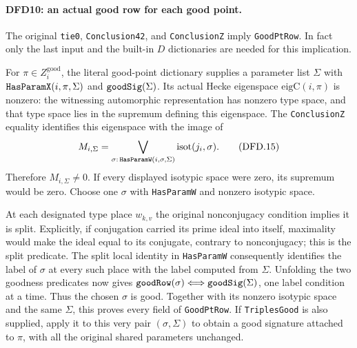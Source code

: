 \documentclass[11pt,a4paper]{article}
\numberwithin{equation}{section}
\theoremstyle{remark}\newtheorem{remark}[theorem]{Remark}
\begin{document}
\paragraph{DFD10: an actual good row for each good point.}
\label{claim:DFD10}
The original \texttt{tie0}, \texttt{Conclusion42}, and
\texttt{Conclusion\allowbreak Z} imply \texttt{Good\allowbreak Pt\allowbreak Row}. In fact
only the last input and the built-in $D$ dictionaries are
needed for this implication.

For $\pi\in Z_i^{\mathrm{good}}$, the literal good-point
dictionary supplies a parameter list $\Sigma$ with
$\texttt{Has\allowbreak Param\allowbreak X}(i,\pi,\Sigma)$ and
$\texttt{good\allowbreak Sig}(\Sigma)$. Its actual Hecke eigenspace
$\mathrm{eigC}(i,\pi)$ is nonzero: the witnessing
automorphic representation has nonzero type space, and that
type space lies in the supremum defining this eigenspace.
The \texttt{Conclusion\allowbreak Z} equality identifies this eigenspace
with the image of
\[
 M_{i,\Sigma}
    =\bigvee_{\sigma:\,\texttt{Has\allowbreak Param\allowbreak W}(i,\sigma,\Sigma)}
                      \mathrm{isot}(j_i,\sigma).         \tag{DFD.15}
\]
Therefore $M_{i,\Sigma}\ne0$. If every displayed isotypic
space were zero, its supremum would be zero. Choose one
$\sigma$ with \texttt{Has\allowbreak Param\allowbreak W} and nonzero isotypic space.

At each designated type place $w_{k,v}$ the original
nonconjugacy condition implies it is split. Explicitly, if
conjugation carried its prime ideal into itself, maximality
would make the ideal equal to its conjugate, contrary to
nonconjugacy; this is the split predicate. The split local
identity in \texttt{Has\allowbreak Param\allowbreak W} consequently identifies the
label of $\sigma$ at every such place with the label computed
from $\Sigma$. Unfolding the two goodness predicates now
gives
$\texttt{good\allowbreak Row}(\sigma)\Longleftrightarrow
\texttt{good\allowbreak Sig}(\Sigma)$, one label condition at a time.
Thus the chosen $\sigma$ is good. Together with its nonzero
isotypic space and the same $\Sigma$, this proves every field
of \texttt{Good\allowbreak Pt\allowbreak Row}. If \texttt{Triples\allowbreak Good} is also
supplied, apply it to this very pair $(\sigma,\Sigma)$ to
obtain a good signature attached to $\pi$, with all the
original shared parameters unchanged.

\end{document}
